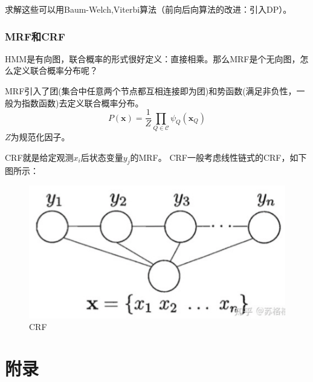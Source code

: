 \documentclass[12pt]{article}
\begin{document}
求解这些可以用Baum-Welch,Viterbi算法（前向后向算法的改进：引入DP）。

\subsubsection{MRF和CRF}
HMM是有向图，联合概率的形式很好定义：直接相乘。那么MRF是个无向图，怎么定义联合概率分布呢？

MRF引入了团(集合中任意两个节点都互相连接即为团)和势函数(满足非负性，一般为指数函数)去定义联合概率分布。
\begin{equation}
    \nonumber
    P(\mathbf{x})=\frac{1}{Z} \prod_{Q \in \mathcal{C}} \psi_{Q}\left(\mathbf{x}_{Q}\right)
\end{equation}
$Z$为规范化因子。

CRF就是给定观测$x_{i}$后状态变量$y_{j}$的MRF。
CRF一般考虑线性链式的CRF，如下图所示：
\begin{figure}[ht]
    \centering
    \includegraphics[scale=0.5]{./img/CRF.png}
    \caption{CRF}
    \label{fig:CRF}
\end{figure}
\newpage
\section{附录}
\end{document}
